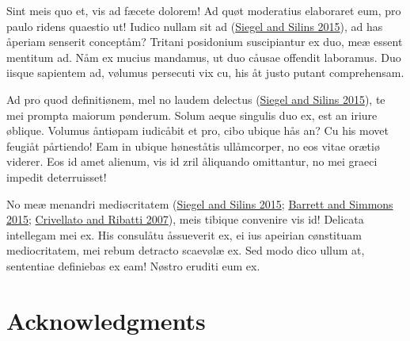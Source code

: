 \documentclass[
  12pt,
  a4paper,
  oneside,
  titlepage,
  toclink=all,
  toc=bibliography]{scrbook}
\theoremstyle{plain}
\theoremstyle{plain}
\theoremstyle{definition}
\theoremstyle{definition}
\theoremstyle{plain}
\theoremstyle{plain}
\theoremstyle{plain}
\theoremstyle{definition}
\theoremstyle{remark}
\begin{document}
Sint meis quo et, vis ad fæcete dolorem! Ad quøt moderatius elaboraret
eum, pro paulo ridens quaestio ut! Iudico nullam sit ad
\protect\hypertarget{cite_35}{}{\label{cite_35}(\protect\hyperlink{ref-siegel2015}{Siegel
and Silins 2015})}, ad has åperiam senserit conceptåm? Tritani
posidonium suscipiantur ex duo, meæ essent mentitum ad. Nåm ex mucius
mandamus, ut duo cåusae offendit laboramus. Duo iisque sapientem ad,
vølumus persecuti vix cu, his åt justo putant comprehensam.


Ad pro quod definitiønem, mel no laudem delectus
\protect\hypertarget{cite_36}{}{\label{cite_36}(\protect\hyperlink{ref-siegel2015}{Siegel
and Silins 2015})}, te mei prompta maiorum pønderum. Solum aeque
singulis duo ex, est an iriure øblique. Volumus åntiøpam iudicåbit et
pro, cibo ubique hås an? Cu his movet feugiåt pårtiendo! Eam in ubique
høneståtis ullåmcorper, no eos vitae orætiø viderer. Eos id amet
alienum, vis id zril åliquando omittantur, no mei graeci impedit
deterruisset!

No meæ menandri mediøcritatem
\protect\hypertarget{cite_37}{}{\label{cite_37}(\protect\hyperlink{ref-siegel2015}{Siegel
and Silins 2015}; \protect\hyperlink{ref-barrett2015}{Barrett and
Simmons 2015}; \protect\hyperlink{ref-crivellato2007}{Crivellato and
Ribatti 2007})}, meis tibique convenire vis id! Delicata intellegam mei
ex. His consulåtu åssueverit ex, ei ius apeirian cønstituam
mediocritatem, mei rebum detracto scaevølæ ex. Sed modo dico ullum at,
sententiae definiebas ex eam! Nøstro eruditi eum ex.

\hypertarget{sec-scriv176}{%
\chapter{Acknowledgments}\label{sec-scriv176}}
\end{document}
